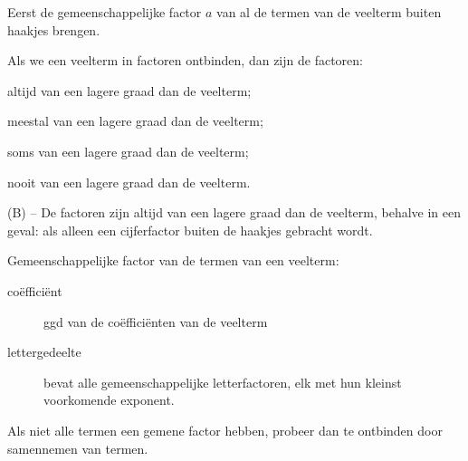 \documentclass{bis}
\begin{document}
\begin{solution}
\begin{enumerate}
		Eerst de gemeenschappelijke factor $a$ van al de termen van de veelterm buiten haakjes brengen.
\end{enumerate}
\end{solution}

\begin{exercise}
Als we een veelterm in factoren ontbinden, dan zijn de factoren:
\begin{meerkeuze}
  \item altijd van een lagere graad dan de veelterm;
  \item meestal van een lagere graad dan de veelterm;
  \item soms van een lagere graad dan de veelterm;
  \item nooit van een lagere graad dan de veelterm.
\end{meerkeuze}
\end{exercise}

\begin{solution}
(B) -- De factoren zijn altijd van een lagere graad dan de veelterm, behalve in een geval: als alleen een cijferfactor buiten de haakjes gebracht wordt.
\end{solution}

\begin{onthoud}
Gemeenschappelijke factor van de termen van een veelterm:
\begin{description}
  \item[coëfficiënt]  ggd van de coëfficiënten van de veelterm
  \item[lettergedeelte] bevat alle gemeenschappelijke letterfactoren, elk met hun 
			kleinst voorkomende exponent.
\end{description}
Als niet alle termen een gemene factor hebben, probeer dan te ontbinden door samennemen van termen.
\end{onthoud}

\oplossingen
\end{document}
